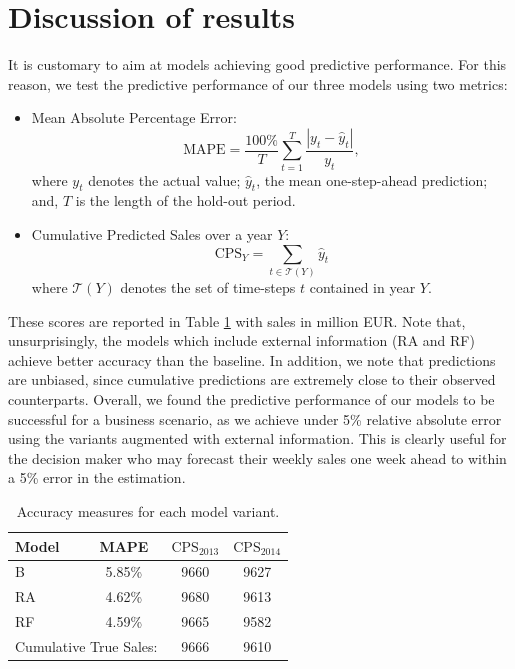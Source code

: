 


\section{Discussion of results}

It is customary to aim at models achieving good predictive performance. %
For this reason, we test the predictive performance of our three models using two metrics:

\begin{itemize}
\item Mean Absolute Percentage Error: $$ \text{MAPE} = \frac{100\%}{T}\sum_{t=1}^T \frac{|y_t - \hat{y}_t|}{y_t},$$
where $y_t$ denotes the actual value; $\hat{y}_t$, the mean one-step-ahead prediction; and, $T$ is the length of the hold-out period.
\item Cumulative Predicted Sales over a year $Y$:
$$
\text{CPS}_{Y} = \sum_{t \in \mathcal{T}(Y)} \hat{y}_t
$$
where $\mathcal{T}(Y)$ denotes the set of time-steps $t$ contained in year $Y$.
\end{itemize}
These scores are reported in Table \ref{tab:mapes} with sales in million EUR. Note that, unsurprisingly, the models which include external information (RA and RF) achieve better accuracy than the baseline. In addition, we note that predictions are unbiased, since cumulative predictions are extremely close to their observed counterparts. Overall, we found the predictive performance of our models to be successful for a business scenario, as we achieve under 5\% relative absolute error using the variants augmented with external information. This is clearly useful for the decision maker who may forecast their weekly sales one week ahead to within a 5\% error in the estimation.

\begin{table}[H]
\centering
\begin{tabular}{|l|c|c|c|}
\hline
Model & MAPE & $\text{CPS}_{2013}$ & $\text{CPS}_{2014}$ \\
\hline
B &  5.85\% &   9660 & 9627 \\
RA &  4.62\% &  9680 & 9613 \\
RF &  4.59\% &  9665 & 9582 \\
\hline
\multicolumn{2}{|c|}{Cumulative True Sales:} & 9666 & 9610 \\
\hline
\end{tabular}
\caption{Accuracy measures for each model variant.} \label{tab:mapes}
\end{table}

